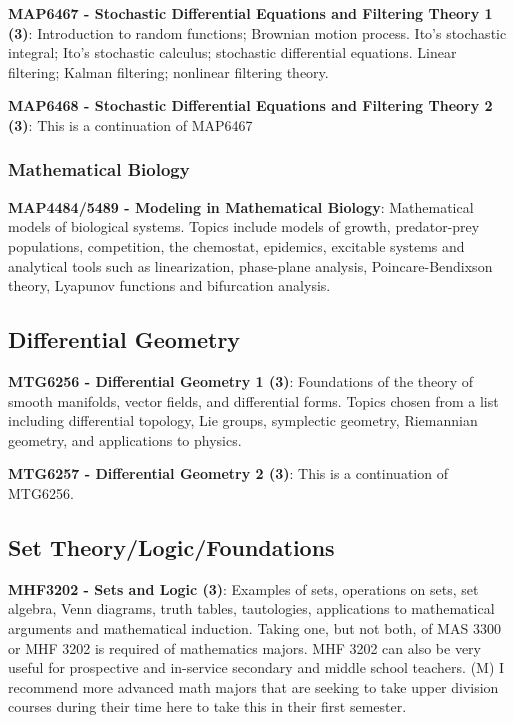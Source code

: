 \documentclass[11pt]{article}
\begin{document}
\textbf{MAP6467 - Stochastic Differential Equations and Filtering Theory 1 (3)}: Introduction to random functions; Brownian motion process. Ito's stochastic integral; Ito's stochastic calculus; stochastic differential equations. Linear filtering; Kalman filtering; nonlinear filtering theory.

\textbf{MAP6468 - Stochastic Differential Equations and Filtering Theory 2 (3)}: This is a continuation of MAP6467

\subsubsection{\colorbox{bio}{Mathematical Biology}}

\textbf{MAP4484/5489 - Modeling in Mathematical Biology}: Mathematical models of biological systems. Topics include models of growth, predator-prey populations, competition, the chemostat, epidemics, excitable systems and analytical tools such as linearization, phase-plane analysis, Poincare-Bendixson theory, Lyapunov functions and bifurcation analysis. 

\subsection{\colorbox{diffG}{Differential Geometry}}

\textbf{MTG6256 - Differential Geometry 1 (3)}: Foundations of the theory of smooth manifolds, vector fields, and differential forms. Topics chosen from a list including differential topology, Lie groups, symplectic geometry, Riemannian geometry, and applications to physics.

\textbf{MTG6257 - Differential Geometry 2 (3)}: This is a continuation of MTG6256.

\subsection{\colorbox{logos}{Set Theory/Logic/Foundations}}

\textbf{MHF3202 - Sets and Logic (3)}: Examples of sets, operations on sets, set algebra, Venn diagrams, truth tables, tautologies, applications to mathematical arguments and mathematical induction. Taking one, but not both, of MAS 3300 or MHF 3202 is required of mathematics majors. MHF 3202 can also be very useful for prospective and in-service secondary and middle school teachers. (M) I recommend more advanced math majors that are seeking to take upper division courses during their time here to take this in their first semester.
\end{document}
